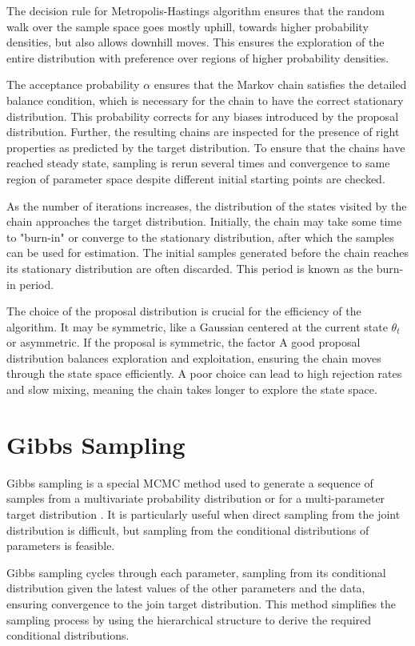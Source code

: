 \documentclass{article}
\begin{document}
The decision rule for Metropolis-Hastings algorithm ensures that the random walk over the sample space goes mostly uphill, towards higher probability densities, but also allows downhill moves. This ensures the exploration of the entire distribution with preference over regions of higher probability densities. 

The acceptance probability $\alpha$ ensures that the Markov chain satisfies the detailed balance condition, which is necessary for the chain to have the correct stationary distribution. This probability corrects for any biases introduced by the proposal distribution. Further, the resulting chains are inspected for the presence of right properties as predicted by the target distribution. To ensure that the chains have reached steady state, sampling is rerun several times and convergence to same region of parameter space despite different initial starting points are checked.

As the number of iterations increases, the distribution of the states visited by the chain approaches the target distribution. Initially, the chain may take some time to "burn-in" or converge to the stationary distribution, after which the samples can be used for estimation. The initial samples generated before the chain reaches its stationary distribution are often discarded. This period is known as the burn-in period.

The choice of the proposal distribution is crucial for the efficiency of the algorithm. It may be symmetric, like a Gaussian centered at the current state $\theta_t$ or asymmetric. If the proposal is symmetric, the factor  A good proposal distribution balances exploration and exploitation, ensuring the chain moves through the state space efficiently. A poor choice can lead to high rejection rates and slow mixing, meaning the chain takes longer to explore the state space.

\section{Gibbs Sampling}

Gibbs sampling is a special MCMC method used to generate a sequence of samples from a multivariate probability distribution or for a multi-parameter target distribution \cite{bolstad2016introduction}. It is particularly useful when direct sampling from the joint distribution is difficult, but sampling from the conditional distributions of parameters is feasible.

Gibbs sampling cycles through each parameter, sampling from its conditional distribution given the latest values of the other parameters and the data, ensuring convergence to the join target distribution. This method simplifies the sampling process by using the hierarchical structure to derive the required conditional distributions.
\end{document}
